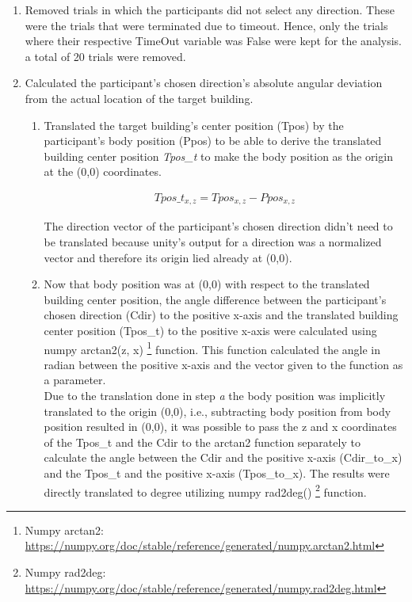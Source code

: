\begin{enumerate}
	\item Removed trials in which the participants did not select any direction. These were the trials that were terminated due to timeout. Hence, only the trials where their respective TimeOut variable was False were kept for the analysis. a total of 20 trials were removed. \\
	
	\item Calculated the participant's chosen direction's absolute angular deviation from the actual location of the target building.
	
	\begin{enumerate}
		\item Translated the target building's center position {\emphasize(Tpos)} by the participant's body position {\emphasize(Ppos)} to be able to derive the translated building center position {\emph{Tpos\_t}} to make the body position as the origin at the (0,0) coordinates.
		
			\begin{align*}
				Tpos\_t_{x,z}= Tpos_{x,z} - Ppos_{x,z}
			\end{align*}
		
		The direction vector of the participant's chosen direction didn't need to be translated because unity's output for a direction was a normalized vector and therefore its origin lied already at (0,0).\\
		
		\item Now that body position was at (0,0) with respect to the translated building center position, the angle difference between the participant's chosen direction {\emphasize(Cdir)} to the positive x-axis and the translated building center position {\emphasize(Tpos\_t)} to the positive x-axis were calculated using numpy arctan2(z, x) \footnote{Numpy arctan2: \href{https://numpy.org/doc/stable/reference/generated/numpy.arctan2.html}{https://numpy.org/doc/stable/reference/generated/numpy.arctan2.html}} function. This function calculated the angle in radian between the positive x-axis and the vector given to the function as a parameter. \\
		
		Due to the translation done in step \emph{a} the body position was implicitly translated to the origin (0,0), i.e., subtracting body position from body position resulted in (0,0), it was possible to pass the z and x coordinates of the {\emphasize Tpos\_t} and the {\emphasize Cdir} to the arctan2 function separately to calculate the angle between the {\emphasize Cdir} and the positive x-axis {\emphasize (Cdir\_to\_x)} and the {\emphasize Tpos\_t} and the positive x-axis {\emphasize (Tpos\_to\_x)}. The results were directly translated to degree utilizing numpy rad2deg() \footnote{Numpy rad2deg: \href{https://numpy.org/doc/stable/reference/generated/numpy.rad2deg.html}{https://numpy.org/doc/stable/reference/generated/numpy.rad2deg.html}} function.
	

\end{enumerate}
\end{enumerate}
